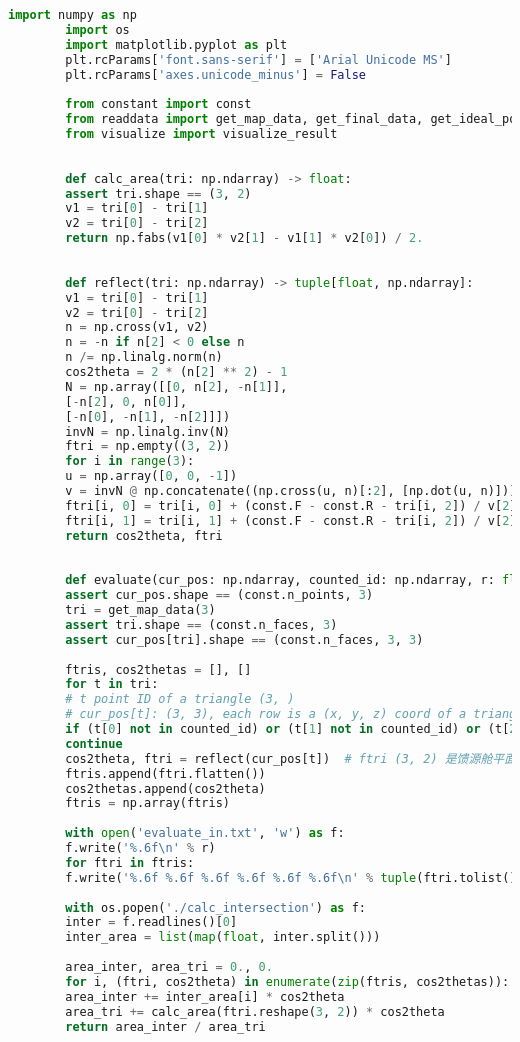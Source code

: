 \documentclass[withoutpreface,bwprint,fontset=macnew]{cumcmthesis} %
\begin{document}
\begin{appendices}
	\begin{lstlisting}[language=python]
		import numpy as np
		import os
		import matplotlib.pyplot as plt
		plt.rcParams['font.sans-serif'] = ['Arial Unicode MS']
		plt.rcParams['axes.unicode_minus'] = False
		
		from constant import const
		from readdata import get_map_data, get_final_data, get_ideal_pos, get_movable_ids
		from visualize import visualize_result
		
		
		def calc_area(tri: np.ndarray) -> float:
		assert tri.shape == (3, 2)
		v1 = tri[0] - tri[1]
		v2 = tri[0] - tri[2]
		return np.fabs(v1[0] * v2[1] - v1[1] * v2[0]) / 2.
		
		
		def reflect(tri: np.ndarray) -> tuple[float, np.ndarray]:
		v1 = tri[0] - tri[1]
		v2 = tri[0] - tri[2]
		n = np.cross(v1, v2)
		n = -n if n[2] < 0 else n
		n /= np.linalg.norm(n)
		cos2theta = 2 * (n[2] ** 2) - 1
		N = np.array([[0, n[2], -n[1]],
		[-n[2], 0, n[0]],
		[-n[0], -n[1], -n[2]]])
		invN = np.linalg.inv(N)
		ftri = np.empty((3, 2))
		for i in range(3):
		u = np.array([0, 0, -1])
		v = invN @ np.concatenate((np.cross(u, n)[:2], [np.dot(u, n)]))
		ftri[i, 0] = tri[i, 0] + (const.F - const.R - tri[i, 2]) / v[2] * v[0]
		ftri[i, 1] = tri[i, 1] + (const.F - const.R - tri[i, 2]) / v[2] * v[1]
		return cos2theta, ftri
		
		
		def evaluate(cur_pos: np.ndarray, counted_id: np.ndarray, r: float = 0.5) -> float:
		assert cur_pos.shape == (const.n_points, 3)
		tri = get_map_data(3)
		assert tri.shape == (const.n_faces, 3)
		assert cur_pos[tri].shape == (const.n_faces, 3, 3)
		
		ftris, cos2thetas = [], []
		for t in tri:
		# t point ID of a triangle (3, )
		# cur_pos[t]: (3, 3), each row is a (x, y, z) coord of a triangle
		if (t[0] not in counted_id) or (t[1] not in counted_id) or (t[2] not in counted_id):
		continue
		cos2theta, ftri = reflect(cur_pos[t])  # ftri (3, 2) 是馈源舱平面光线坐标
		ftris.append(ftri.flatten())
		cos2thetas.append(cos2theta)
		ftris = np.array(ftris)
		
		with open('evaluate_in.txt', 'w') as f:
		f.write('%.6f\n' % r)
		for ftri in ftris:
		f.write('%.6f %.6f %.6f %.6f %.6f %.6f\n' % tuple(ftri.tolist()))
		
		with os.popen('./calc_intersection') as f:
		inter = f.readlines()[0]
		inter_area = list(map(float, inter.split()))
		
		area_inter, area_tri = 0., 0.
		for i, (ftri, cos2theta) in enumerate(zip(ftris, cos2thetas)):
		area_inter += inter_area[i] * cos2theta
		area_tri += calc_area(ftri.reshape(3, 2)) * cos2theta
		return area_inter / area_tri
		

\end{lstlisting}
\end{appendices}
\end{document}
